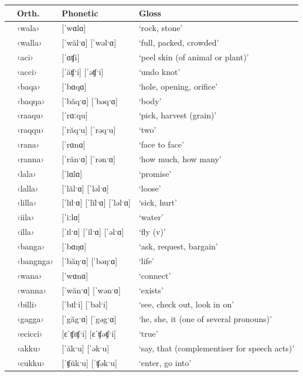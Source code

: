 {\wg\begin{xltabular}{\linewidth}{>{\hspace{-\tabcolsep}}l<{\hspace{-\tabcolsep}}>{\hspace{-\tabcolsep}\enspace}llX}
\lsptoprule
{}		&	Orth.	&	Phonetic	&	Gloss		\\ \midrule
\endhead
&	‹wala›	&	[ˈwɑlɑ]	&	‘rock, stone’		\\
	&	‹walla›	&	[ˈwălˑɑ] {\tl} [ˈwəlˑɑ]	&	‘full, packed, crowded’		\\
	&	‹aci›	&	[ˈɑʧi]	&	‘peel skin (of animal or plant)’		\\
	&	‹acci›	&	[ˈăʧˑi] {\tl} [ˈəʧˑi]	&	‘undo knot’		\\
	&	‹baqa›	&	[ˈbɑqɑ]	&	‘hole, opening, orifice’		\\
	&	‹baqqa›	&	[ˈbăqˑɑ] {\tl} [ˈbəqˑɑ]	&	‘body’		\\
	&	‹raaqu›	&	[ˈrɑːqu]	&	‘pick, harvest (grain)’		\\
	&	‹raqqu›	&	[ˈrăqˑu] {\tl} [ˈrəqˑu]	&	‘two’		\\
	&	‹rana›	&	[ˈrɑnɑ]	&	‘face to face’		\\
	&	‹ranna›	&	[ˈrănˑɑ] {\tl} [ˈrənˑɑ]	&	‘how much, how many’		\\
	&	‹lala›	&	[ˈlɑlɑ]	&	‘promise’		\\
	&	‹lalla›	&	[ˈlălˑɑ] {\tl} [ˈləlˑɑ]	&	‘loose’		\\
	&	‹lilla›	&	[ˈlɪlˑɑ] {\tl} [ˈlĭlˑɑ] {\tl} [ˈləlˑɑ]	&	‘sick, hurt’		\\
	&	‹iila›	&	[ˈiːlɑ]	&	‘water’		\\
	&	‹illa›	&	[ˈɪlˑɑ] {\tl} [ˈĭlˑɑ] {\tl} [ˈəlˑɑ]	&	‘fly (v)’		\\
	&	‹banga›	&	[ˈbɑŋɑ]	&	‘ask, request, bargain’		\\
	&	‹bangnga›	&	[ˈbăŋˑɑ] {\tl} [ˈbəŋˑɑ]	&	‘life’		\\
	&	‹wana›	&	[ˈwɑnɑ]	&	‘connect’		\\
	&	‹wanna›	&	[ˈwănˑɑ] {\tl} [ˈwənˑɑ]	&	‘exists’		\\
	&	‹billi›	&	[ˈbɪlˑi] {\tl} [ˈbəlˑi]	&	‘see, check out, look in on’		\\
	&	‹gagga›	&	[ˈgăgˑɑ] {\tl} [ˈgəgˑɑ]	&	‘he, she, it (one of several  pronouns)’		\\
	&	‹ecicci›	&	[ɛˈʧɪʧˑi] {\tl} [ɛˈʧəʧˑi]	&	‘true’		\\
	&	‹akku›	&	[ˈăkˑu] {\tl} [ˈəkˑu]	&	‘say, that (complementiser for speech acts)’		\\
	&	‹cukku›	&	[ˈʧŭkˑu] {\tl} [ˈʧəkˑu]	&	‘enter, go into’		\\

\end{xltabular}}
